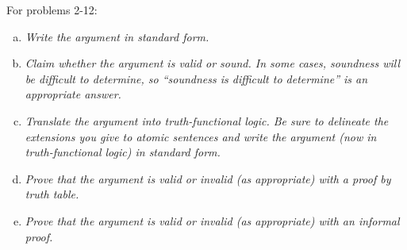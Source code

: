 \documentclass{article}
\begin{document}
\begin{flushleft}
      For problems 2-12:\\
\end{flushleft}
\begin{enumerate}[(a)]
      \item \textit{Write the argument in standard form.}
      \item \textit{Claim whether the argument is valid or sound. In some cases, soundness will be difficult to determine, so “soundness is difficult to determine” is an appropriate answer.}
      \item \textit{Translate the argument into truth-functional logic. Be sure to delineate the extensions you give to atomic sentences and write the argument (now in truth-functional logic) in standard form.}
      \item \textit{Prove that the argument is valid or invalid (as appropriate) with a proof by truth table.}
      \item \textit{Prove that the argument is valid or invalid (as appropriate) with an informal proof.}
\end{enumerate}
\end{document}
